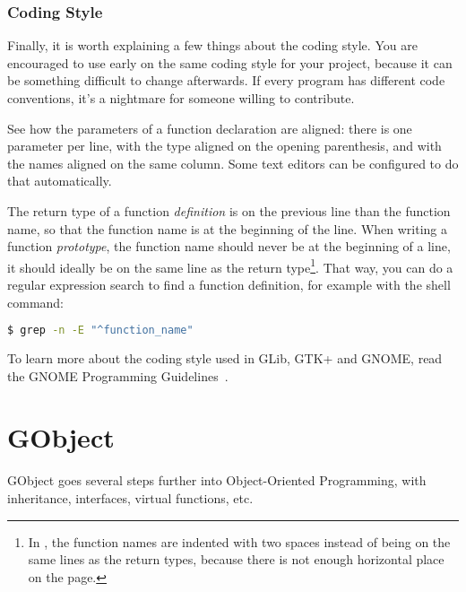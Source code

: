 \subsubsection{Coding Style}

Finally, it is worth explaining a few things about the coding style. You are encouraged to use early on the same coding style for your project, because it can be something difficult to change afterwards. If every program has different code conventions, it's a nightmare for someone willing to contribute.

See how the parameters of a function declaration are aligned: there is one parameter per line, with the type aligned on the opening parenthesis, and with the names aligned on the same column. Some text editors can be configured to do that automatically.

The return type of a function \emph{definition} is on the previous line than the function name, so that the function name is at the beginning of the line. When writing a function \emph{prototype}, the function name should never be at the beginning of a line, it should ideally be on the same line as the return type\footnote{In , the function names are indented with two spaces instead of being on the same lines as the return types, because there is not enough horizontal place on the page.}. That way, you can do a regular expression search to find a function definition, for example with the  shell command:

\begin{lstlisting}[language=bash]
$ grep -n -E "^function_name"
\end{lstlisting}

To learn more about the coding style used in GLib, GTK+ and GNOME, read the GNOME Programming Guidelines~\cite{gnome-programming-guidelines}.

\section{GObject}

GObject goes several steps further into Object-Oriented Programming, with inheritance, interfaces, virtual functions, etc.

